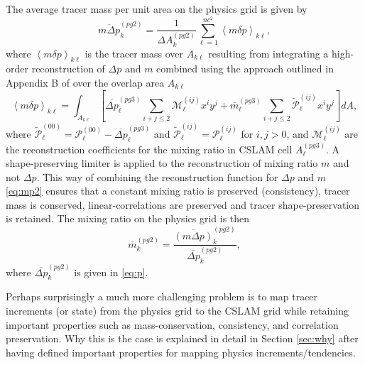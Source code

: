 The average tracer mass per unit area on the physics grid is given by
\begin{equation}
\label{eq:mp}
\overline{m\Delta p}^{(pg2)}_k=\frac{1}{\Delta A^{(pg2)}_k}\sum_{\ell=1}^{nc^2}\left< m\delta p\right>_{k\ell},
\end{equation}
where $\left< m\delta p\right>_{k\ell}$ is the tracer mass over $A_{k\ell}$ resulting from integrating a high-order reconstruction of $\Delta p$ and $m$ combined using the approach outlined in Appendix B of \cite{NL2010JCP} over the overlap area $A_{k\ell}$
\begin{equation}
\label{eq:mp2}
\left< m\delta p\right>_{k\ell}=\int_{A_{k\ell}}\left[ \overline{\Delta p}_\ell^{(pg3)}\sum_{i+j\le 2}{\mathcal{M}}^{(ij)}_\ell x^{i}y^{j}+{\overline{m}}_\ell^{(pg3)}\sum_{i+j\le 2}{\widetilde{{\mathcal{P}}}}^{(ij)}_\ell x^{i}y^{j}\right] dA,
\end{equation}
where ${\widetilde{{\mathcal{P}}}}^{(00)}_\ell={\mathcal{P}}^{(00)}_\ell-\overline{\Delta p}^{(pg3)}_\ell$ and ${\widetilde{{\mathcal{P}}}}^{(ij)}_\ell={\mathcal{P}}^{(ij)}_\ell$ for $i,j>0$, and ${\mathcal{M}}^{(ij)}_\ell$ are the reconstruction coefficients for the mixing ratio in CSLAM cell $A^{(pg3)}_\ell$. A shape-preserving limiter is applied to the reconstruction of mixing ratio $m$ \citep{BJ1989} and not $\Delta p$. This way of combining the reconstruction function for $\Delta p$ and $m$ \eqref{eq:mp2} ensures that a constant mixing ratio is preserved (consistency), tracer mass is conserved, linear-correlations are preserved and tracer shape-preservation is retained. The mixing ratio on the physics grid is then
\begin{equation}
{\overline{m}}^{(pg2)}_k=\frac{\overline{\left( m\Delta p\right)}^{(pg2)}_k}{\overline{\Delta p}^{(pg2)}_k},
\end{equation}
where $\overline{\Delta p}^{(pg2)}_k$ is given in \eqref{eq:p}. 

Perhaps surprisingly a much more challenging problem is to map tracer increments (or state) from the physics grid to the CSLAM grid while retaining important properties such as mass-conservation, consistency, and correlation preservation. Why this is the case is explained in detail in Section \ref{sec:why} after having defined important properties for mapping physics increments/tendencies.
